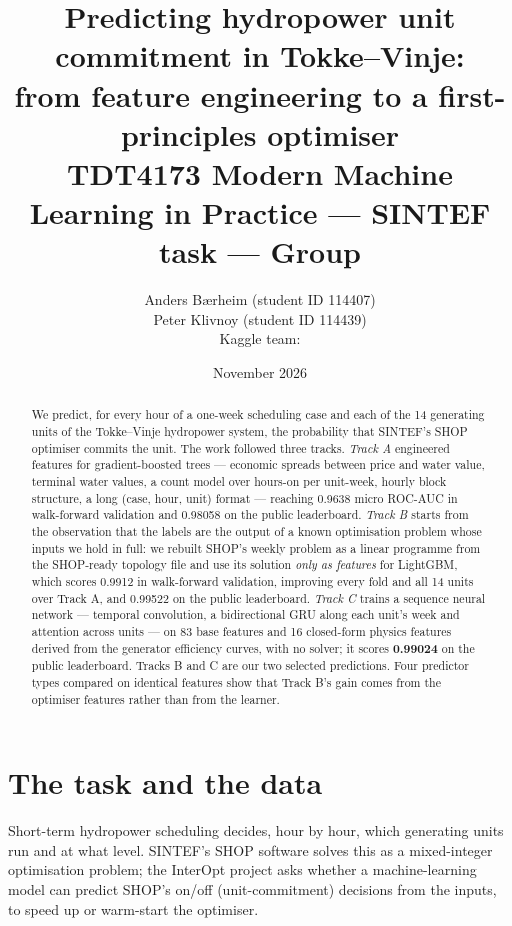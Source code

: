 \documentclass[11pt]{article}
\title{Predicting hydropower unit commitment in Tokke--Vinje:\\
from feature engineering to a first-principles optimiser\\[4pt]
\large TDT4173 Modern Machine Learning in Practice --- SINTEF task --- Group \groupno}
\author{Anders Bærheim (student ID 114407)\\ Peter Klivnoy (student ID 114439)\\[6pt]
Kaggle team: \kaggleteam}
\date{November 2026}
\newcommand{\kagglelp}{0.99522}                        %
\newcommand{\kagglenn}{0.99024}                        %
\begin{document}
\maketitle

\begin{abstract}
We predict, for every hour of a one-week scheduling case and each of the 14 generating units of the
Tokke--Vinje hydropower system, the probability that SINTEF's SHOP optimiser commits the unit. The
work followed three tracks. \emph{Track A} engineered features for gradient-boosted trees ---
economic spreads between price and water value, terminal water values, a count model over hours-on
per unit-week, hourly block structure, a long (case, hour, unit) format --- reaching 0.9638 micro
ROC-AUC in walk-forward validation and 0.98058 on the public leaderboard. \emph{Track B} starts from
the observation that the labels are the output of a known optimisation problem whose inputs we hold
in full: we rebuilt SHOP's weekly problem as a linear programme from the SHOP-ready topology file and
use its solution \emph{only as features} for LightGBM, which scores 0.9912 in walk-forward
validation, improving every fold and all 14 units over Track A, and \kagglelp{} on the public
leaderboard. \emph{Track C} trains a sequence neural network --- temporal convolution, a
bidirectional GRU along each unit's week and attention across units --- on 83 base features and 16
closed-form physics features derived from the generator efficiency curves, with no solver; it scores
\textbf{\kagglenn{}} on the public leaderboard. Tracks B and C are our two selected predictions. Four
predictor types compared on identical features show that Track B's gain comes from the optimiser
features rather than from the learner.
\end{abstract}

\tableofcontents
\newpage

\section{The task and the data}
\label{sec:r-task}

Short-term hydropower scheduling decides, hour by hour, which generating units run and at what
level. SINTEF's SHOP software solves this as a mixed-integer optimisation problem; the InterOpt
project asks whether a machine-learning model can predict SHOP's on/off (unit-commitment)
decisions from the inputs, to speed up or warm-start the optimiser.
\end{document}
